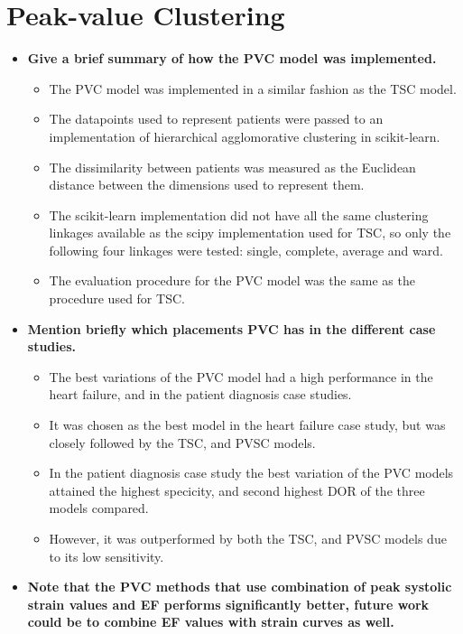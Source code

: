 \section{Peak-value Clustering}

\begin{itemize}
    \item \textbf{Give a brief summary of how the PVC model was implemented.}
    \begin{itemize}
        \item The PVC model was implemented in a similar fashion as the TSC model.
        \item The datapoints used to represent patients were passed to an implementation of hierarchical agglomorative clustering in scikit-learn.
        \item The dissimilarity between patients was measured as the Euclidean distance between the dimensions used to represent them.
        \item The scikit-learn implementation did not have all the same clustering linkages available as the scipy implementation used for TSC,
              so only the following four linkages were tested: single, complete, average and ward.
        \item The evaluation procedure for the PVC model was the same as the procedure used for TSC.
    \end{itemize}
    \item \textbf{Mention briefly which placements PVC has in the different case studies.}
    \begin{itemize}
        \item The best variations of the PVC model had a high performance in the heart failure, and in the patient diagnosis case studies. 
        \item It was chosen as the best model in the heart failure case study, but was closely followed by the TSC, and PVSC models.
        \item In the patient diagnosis case study the best variation of the PVC models attained the highest specicity, and second highest DOR of the three models compared. 
        \item However, it was outperformed by both the TSC, and PVSC models due to its low sensitivity.
    \end{itemize}
    \item \textbf{Note that the PVC methods that use combination of peak systolic strain values and EF performs significantly better, future work could be to combine EF values with strain curves as well.}

\end{itemize}
